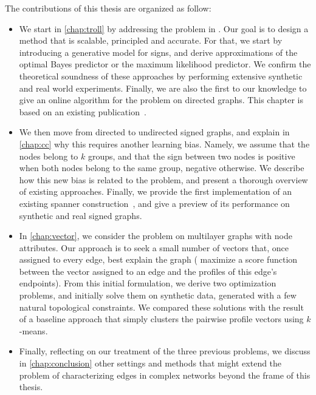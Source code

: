 The contributions of this thesis are organized as follow:

\begin{itemize}

  \item We start in \autoref{chap:troll} by addressing the \esp{} problem in \dssn{}. Our goal is to
    design a method that is scalable, principled and accurate. For that, we start by introducing a
    generative model for signs, and derive approximations of the optimal Bayes predictor or the
    maximum likelihood predictor. We confirm the theoretical soundness of these approaches by
    performing extensive synthetic and real world experiments. Finally, we are also the first to our
    knowledge to give an online algorithm for the \esp{} problem on directed graphs. This chapter is
    based on an existing publication~\autocite{trollSign17}.

  \item We then move from directed to undirected signed graphs, and explain in \autoref{chap:cc} why
    this requires another learning bias. Namely, we assume that the nodes belong to $k$ groups, and
    that the sign between two nodes is positive when both nodes belong to the same group, negative
    otherwise. We describe how this new bias is related to the \pcc{} problem, and present a
    thorough overview of existing approaches. Finally, we provide the first implementation of an
    existing spanner construction~\autocite{gtxFabio}, and give a preview of its performance on
    synthetic and real signed graphs.

 \item In \autoref{chap:vector}, we consider the \ecp{} problem on multilayer graphs with node
   attributes. Our approach is to seek a small number of vectors that, once assigned to every edge,
   best explain the graph (\ie{} maximize a score function between the vector assigned to an edge
   and the profiles of this edge's endpoints). From this initial formulation, we derive two
   optimization problems, and initially solve them on synthetic data, generated with a few natural
   topological constraints. We compared these solutions with the result of a baseline approach that
   simply clusters the pairwise profile vectors using $k$-means.

  \item Finally, reflecting on our treatment of the three previous problems, we discuss in
    \autoref{chap:conclusion} other settings and methods that might extend the problem of
    characterizing edges in complex networks beyond the frame of this thesis.

\end{itemize}
